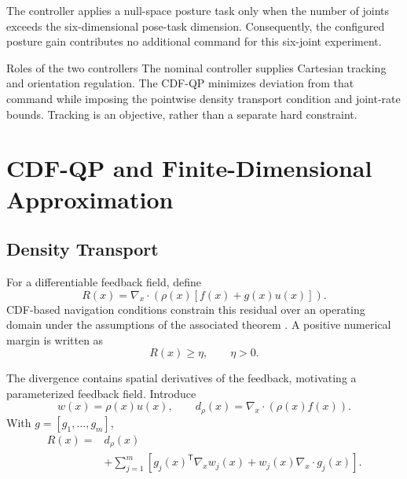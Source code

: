 \documentclass[conference]{IEEEtran}
\newcommand{\trans}{^{\mathsf T}}
\begin{document}
The controller applies a null-space posture task
only when the number of joints exceeds the
six-dimensional pose-task dimension. Consequently,
the configured posture gain contributes no additional
command for this six-joint experiment.

\begin{methodbox}{Roles of the two controllers}
The nominal controller supplies Cartesian tracking
and orientation regulation. The CDF-QP minimizes
deviation from that command while imposing the
pointwise density transport condition and joint-rate
bounds. Tracking is an objective, rather than
a separate hard constraint.
\end{methodbox}

\section{CDF-QP and Finite-Dimensional Approximation}
\label{sec:cdf}

\subsection{Density Transport}

For a differentiable feedback field, define
\begin{equation}
    R(x)=
    \nabla_x\cdot
    \left(\rho(x)[f(x)+g(x)u(x)]\right).
    \label{eq:residual}
\end{equation}
CDF-based navigation conditions constrain this
residual over an operating domain under the
assumptions of the associated theorem
\cite{moyalan2024synthesizing,moyalan2024robust}.
A positive numerical margin is written as
\begin{equation}
    R(x)\geq\eta,\qquad \eta>0.
\end{equation}

The divergence contains spatial derivatives
of the feedback, motivating a parameterized
feedback field.
Introduce
\begin{equation}
    w(x)=\rho(x)u(x),\qquad
    d_\rho(x)=\nabla_x\cdot(\rho(x)f(x)).
\end{equation}
With $g=[g_1,\ldots,g_m]$,
\begin{equation}
\begin{aligned}
    R(x)={}&d_\rho(x)\\
    &+\sum_{j=1}^{m}
    \left[
        g_j(x)\trans\nabla_xw_j(x)
        +w_j(x)\nabla_x\cdot g_j(x)
    \right].
    \label{eq:flux-residual}
\end{aligned}
\end{equation}
\end{document}
